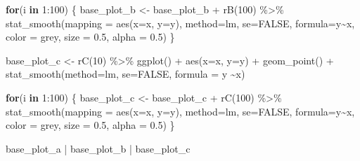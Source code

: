 \documentclass[
]{book}
\newenvironment{Shaded}{\begin{snugshade}}{\end{snugshade}}
\newcommand{\AttributeTok}[1]{\textcolor[rgb]{0.77,0.63,0.00}{#1}}
\newcommand{\ConstantTok}[1]{\textcolor[rgb]{0.00,0.00,0.00}{#1}}
\newcommand{\ControlFlowTok}[1]{\textcolor[rgb]{0.13,0.29,0.53}{\textbf{#1}}}
\newcommand{\DecValTok}[1]{\textcolor[rgb]{0.00,0.00,0.81}{#1}}
\newcommand{\FloatTok}[1]{\textcolor[rgb]{0.00,0.00,0.81}{#1}}
\newcommand{\FunctionTok}[1]{\textcolor[rgb]{0.00,0.00,0.00}{#1}}
\newcommand{\NormalTok}[1]{#1}
\newcommand{\OtherTok}[1]{\textcolor[rgb]{0.56,0.35,0.01}{#1}}
\newcommand{\SpecialCharTok}[1]{\textcolor[rgb]{0.00,0.00,0.00}{#1}}
\newcommand{\StringTok}[1]{\textcolor[rgb]{0.31,0.60,0.02}{#1}}
\theoremstyle{definition}
\theoremstyle{definition}
\theoremstyle{definition}
\theoremstyle{definition}
\theoremstyle{remark}
\begin{document}
\begin{Shaded}
\begin{Highlighting}[]
\ControlFlowTok{for}\NormalTok{(i }\ControlFlowTok{in} \DecValTok{1}\SpecialCharTok{:}\DecValTok{100}\NormalTok{) \{ }
\NormalTok{    base\_plot\_b }\OtherTok{\textless{}{-}}\NormalTok{ base\_plot\_b }\SpecialCharTok{+} \FunctionTok{rB}\NormalTok{(}\DecValTok{100}\NormalTok{) }\SpecialCharTok{\%\textgreater{}\%} 
      \FunctionTok{stat\_smooth}\NormalTok{(}\AttributeTok{mapping =} \FunctionTok{aes}\NormalTok{(}\AttributeTok{x=}\NormalTok{x, }\AttributeTok{y=}\NormalTok{y), }\AttributeTok{method=}\StringTok{\textquotesingle{}lm\textquotesingle{}}\NormalTok{, }\AttributeTok{se=}\ConstantTok{FALSE}\NormalTok{, }\AttributeTok{formula=}\StringTok{\textquotesingle{}y\textasciitilde{}x\textquotesingle{}}\NormalTok{, }\AttributeTok{color =} \StringTok{\textquotesingle{}grey\textquotesingle{}}\NormalTok{, }\AttributeTok{size =} \FloatTok{0.5}\NormalTok{, }\AttributeTok{alpha =} \FloatTok{0.5}\NormalTok{)}
\NormalTok{  \}}

\NormalTok{base\_plot\_c }\OtherTok{\textless{}{-}} \FunctionTok{rC}\NormalTok{(}\DecValTok{10}\NormalTok{) }\SpecialCharTok{\%\textgreater{}\%}  
  \FunctionTok{ggplot}\NormalTok{() }\SpecialCharTok{+} 
  \FunctionTok{aes}\NormalTok{(}\AttributeTok{x=}\NormalTok{x, }\AttributeTok{y=}\NormalTok{y) }\SpecialCharTok{+} 
  \FunctionTok{geom\_point}\NormalTok{() }\SpecialCharTok{+} 
  \FunctionTok{stat\_smooth}\NormalTok{(}\AttributeTok{method=}\StringTok{\textquotesingle{}lm\textquotesingle{}}\NormalTok{, }\AttributeTok{se=}\ConstantTok{FALSE}\NormalTok{, }\AttributeTok{formula =} \StringTok{\textquotesingle{}y \textasciitilde{}x\textquotesingle{}}\NormalTok{)}

\ControlFlowTok{for}\NormalTok{(i }\ControlFlowTok{in} \DecValTok{1}\SpecialCharTok{:}\DecValTok{100}\NormalTok{) \{ }
\NormalTok{    base\_plot\_c }\OtherTok{\textless{}{-}}\NormalTok{ base\_plot\_c }\SpecialCharTok{+} \FunctionTok{rC}\NormalTok{(}\DecValTok{100}\NormalTok{) }\SpecialCharTok{\%\textgreater{}\%} 
      \FunctionTok{stat\_smooth}\NormalTok{(}\AttributeTok{mapping =} \FunctionTok{aes}\NormalTok{(}\AttributeTok{x=}\NormalTok{x, }\AttributeTok{y=}\NormalTok{y), }\AttributeTok{method=}\StringTok{\textquotesingle{}lm\textquotesingle{}}\NormalTok{, }\AttributeTok{se=}\ConstantTok{FALSE}\NormalTok{, }\AttributeTok{formula=}\StringTok{\textquotesingle{}y\textasciitilde{}x\textquotesingle{}}\NormalTok{, }\AttributeTok{color =} \StringTok{\textquotesingle{}grey\textquotesingle{}}\NormalTok{, }\AttributeTok{size =} \FloatTok{0.5}\NormalTok{, }\AttributeTok{alpha =} \FloatTok{0.5}\NormalTok{)}
\NormalTok{\}}



\NormalTok{base\_plot\_a }\SpecialCharTok{|}\NormalTok{ base\_plot\_b  }\SpecialCharTok{|}\NormalTok{ base\_plot\_c}
\end{Highlighting}
\end{Shaded}
\end{document}
